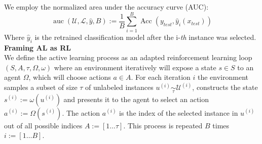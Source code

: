 \documentclass[]{article}
\begin{document}
We employ the normalized area under the accuracy curve (AUC):
\begin{equation}\label{eq:auc}
	\operatorname{auc}(\mathcal{U}, \mathcal{L}, \hat y, B) := \frac{1}{B} \sum_{i=1}^{B} \operatorname{Acc}(y_{test}, \hat y_i(x_{test}))
\end{equation}
Where $\hat y_i$ is the retrained classification model after the i-\textit{th} instance was selected. \\ [1mm]
%
\textbf{Framing AL as RL}\\
We define the active learning process as an adapted reinforcement learning loop $(S, A, \tau, \Omega, \omega)$ where an environment iteratively will expose a state $s \in S$ to an agent $\Omega$, which will choose actions $a \in A$.
For each iteration $i$ the environment samples a subset of size $\tau$ of unlabeled instances $u^{(i)} \underset{\tau}{\sim} \mathcal{U}^{(i)}$, constructs the state $s^{(i)} := \omega(u^{(i)})$ and presents it to the agent to select an action $a^{(i)} := \Omega(s^{(i)})$.
The action $a^{(i)}$ is the index of the selected instance in $u^{(i)}$ out of all possible indices $A := [1 \ldots \tau]$.
This process is repeated $B$ times $i := [1 \ldots B]$.
\end{document}
